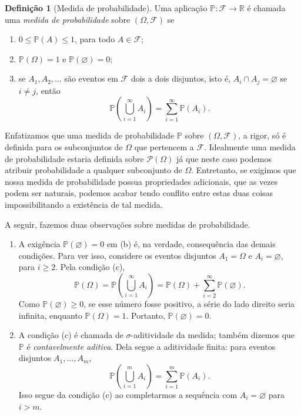 \documentclass[12pt,portuguese]{article}
\let\geq\geqslant
\theoremstyle{definition}
\newtheorem{definition}[definition]{Definição}
\begin{document}
\begin{definition}[Medida de probabilidade]\label{def:probability-measure}
Uma aplicação \(\mathbb{P}: \mathcal{F} \to \mathbb{R}\) é chamada uma
\emph{medida de probabilidade} sobre \((\Omega, \mathcal{F})\) se
\begin{enumerate}[label=(\alph*), ref=\alph*]
\item \(0\leqslant \mathbb{P}(A) \leqslant 1\), para todo \(A \in \mathcal{F}\);
\item \(\mathbb{P}(\Omega) = 1\) e \(\mathbb{P}(\varnothing) = 0\);
\item se \(A_1, A_2, \ldots\) são eventos em \(\mathcal{F}\) dois a dois
disjuntos, isto é, \(A_i \cap A_j = \varnothing\) se \(i \neq j\), então
\begin{equation}
\mathbb{P}\left(\bigcup_{i=1}^{\infty} A_i\right) =
\sum_{i=1}^{\infty} \mathbb{P}(A_i). \tag{1.14} \label{eq:1.14}
\end{equation}
\end{enumerate}
\end{definition}

Enfatizamos que uma medida de probabilidade \(\mathbb{P}\) sobre
\((\Omega, \mathcal{F})\), a rigor, só é definida para os subconjuntos de \(\Omega\) que
pertencem a \(\mathcal{F}\). Idealmente uma medida de probabilidade estaria definida sobre
$\mathscr{P}(\Omega)$ já que neste caso podemos atribuir probabilidade a qualquer subconjunto de $\Omega$.
Entretanto, se exigimos que nossa medida de probabilidade possua propriedades adicionais, 
que as vezes podem ser naturais, podemos acabar tendo conflito entre estas duas coisas impossibilitando 
a existência de tal medida. 

\bigskip 


A seguir, fazemos duas observações
sobre medidas de probabilidade.

\begin{enumerate}[label=(\roman*), ref=\roman*]
\item A exigência \(\mathbb{P}(\varnothing) = 0\) em (b) é, na verdade,
consequência das demais condições. Para ver isso, considere os eventos
disjuntos \(A_1 = \Omega\) e \(A_i = \varnothing\), para \(i \geq 2\).
Pela condição (c),
\[
\mathbb{P}(\Omega) = \mathbb{P}\left(\bigcup_{i=1}^{\infty}
A_i\right) = \mathbb{P}(\Omega) + \sum_{i=2}^{\infty}
\mathbb{P}(\varnothing).
\]
Como \(\mathbb{P}(\varnothing) \geq 0\), se esse número fosse
positivo, a série do lado direito seria infinita, enquanto
\(\mathbb{P}(\Omega) = 1\). Portanto, \(\mathbb{P}(\varnothing) = 0\).
\item A condição (c) é chamada de $\sigma$-aditividade da medida; também
dizemos que \(\mathbb{P}\) é \emph{contavelmente aditiva}. Dela segue
a aditividade finita: para eventos disjuntos \(A_1, \ldots, A_m\),
\[
\mathbb{P}\left(\bigcup_{i=1}^{m} A_i\right) =
\sum_{i=1}^{m} \mathbb{P}(A_i).
\]
Isso segue da condição (c) ao completarmos a sequência com
\(A_i = \varnothing\) para \(i > m\).
\end{enumerate}
\end{document}
